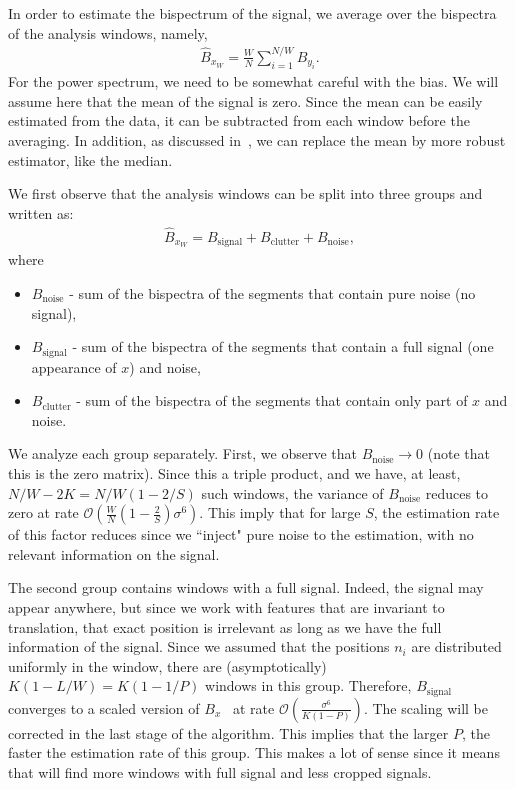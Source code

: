 \documentclass[journal]{IEEEtran}
\numberwithin{equation}{section}
\numberwithin{figure}{section}
\theoremstyle{plain}
\theoremstyle{definition}
\theoremstyle{remark}
\theoremstyle{plain}
\theoremstyle{remark}
\theoremstyle{plain}
\theoremstyle{plain}
\newcommand{\order}[1]{\mathcal{O}\left({#1} \right)}
\begin{document}
In order to estimate the bispectrum of the signal, we average over the bispectra of the analysis windows, namely,
\begin{eqnarray}
\hat{B}_{x_W} = \frac{W}{N}\sum_{i=1}^{N/W}B_{y_i}.
\end{eqnarray}
For the power spectrum, we need  to be somewhat careful with the bias. We will assume here that the mean of the signal is zero. Since the mean can be easily estimated from the data, it can be subtracted from each window before the averaging. 
 In addition, as discussed in~\cite{bendory2017bispectrum}, we can replace the mean by more robust estimator, like the median.

We first observe that the analysis windows can be split into three groups and written as:
\begin{eqnarray}
\hat{B}_{x_W} = B_\textrm{signal} + B_\textrm{clutter} + B_\textrm{noise}, 
\end{eqnarray}
where
\begin{itemize}
	\item $B_\textrm{noise}$ - sum of the bispectra of the segments that contain pure noise (no signal),
	\item $B_\textrm{signal}$ - sum of the bispectra of the segments that contain a full signal (one appearance of $x$) and noise,
	\item $B_\textrm{clutter}$ - sum of the bispectra of the segments that contain only part of $x$ and noise.
\end{itemize}

We analyze each group separately. First, we observe that $B_\textrm{noise}\to 0$ (note that this is the zero matrix). Since this a triple product, and we have, at least, $N/W-2K =N/W(1-2/S) $ such windows, the variance of $B_\textrm{noise}$ reduces to zero at rate  $\order{\frac{W}{N}\left(1-\frac{2}{S}\right)\sigma^6}$. This imply that for large $S$, the estimation rate of this factor reduces since we ``inject" pure noise to the estimation, with no relevant information on the signal.

The second group contains windows with a full signal. Indeed, the signal may appear anywhere, but since we work with features that are invariant to translation, that exact position is irrelevant as long as we have the full information of the signal. Since we assumed that the positions  $n_i$ are distributed uniformly in the window, there are (asymptotically) $K(1-L/W) = K(1-1/P)$ windows in this group. 
Therefore, $B_\textrm{signal}$ converges to a scaled version of $B_x$  \ at rate $\order{\frac{\sigma^6}{K(1-P)}}$. The scaling will be corrected in the last stage of the algorithm. This implies that the larger $P$, the faster the estimation rate of this group. This makes a lot of sense since it means that will find more windows with full signal and less cropped signals.
\end{document}

